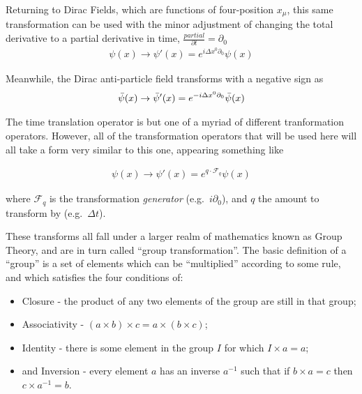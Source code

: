     Returning to Dirac Fields, which are functions of four-position $x_\mu$, this same transformation can be used
         with the minor adjustment of changing the total derivative to a partial derivative in time, $\frac{partial}{\partial t} = \partial_0$
    \begin{equation} \begin{split}
    \psi(x) \rightarrow \psi'(x) = e^{i\Delta x^0 \partial_0} \psi(x)
    \end{split} \end{equation}

    Meanwhile, the Dirac anti-particle field transforms with a negative sign as
    \begin{equation} \begin{split}
        \bar{\psi}(x) \rightarrow \bar{\psi}'(x) = e^{-i\Delta x^0 \partial_0} \bar{\psi}(x)
    \end{split} \end{equation}
    
    The time translation operator is but one of a myriad of different tranformation operators.
    However, all of the transformation operators that will be used here will all take a form very similar to this one,
        appearing something like

    \begin{equation} \begin{split}
        \psi(x) \rightarrow \psi'(x) = e^{ q \cdot \mathcal{F}_q } \psi(x)
    \end{split} \end{equation}

    where $\mathcal{F}_q$ is the transformation \textit{generator} (e.g.\ $i\partial_0$),
        and $q$ the amount to transform by (e.g.\ $\Delta t$).

    These transforms all fall under a larger realm of mathematics known as Group Theory,
        and are in turn called ``group transformation''.
    The basic definition of a ``group'' is a set of elements which can be ``multiplied'' according to some rule,
        and which satisfies the four conditions of\cite{Cheng_book}:
    \begin{itemize}
        \item Closure - the product of any two elements of the group are still in that group;
        \item Associativity - $(a \times b)\times c = a\times(b \times c)$;
        \item Identity - there is some element in the group $I$ for which $I \times a=a$;
        \item and Inversion - every element $a$ has an inverse $a^{-1}$ such that if $b \times a = c$ then $c \times a^{-1} = b$.
    \end{itemize}

